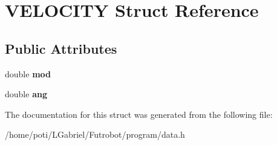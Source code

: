 \hypertarget{structVELOCITY}{}\section{V\+E\+L\+O\+C\+I\+TY Struct Reference}
\label{structVELOCITY}
\subsection*{Public Attributes}
\begin{DoxyCompactItemize}
\item 
double {\bfseries mod}\hypertarget{structVELOCITY_a93279f041bc0819612560a52082b3d51}{}\label{structVELOCITY_a93279f041bc0819612560a52082b3d51}

\item 
double {\bfseries ang}\hypertarget{structVELOCITY_abac02532546a545b611747a744097303}{}\label{structVELOCITY_abac02532546a545b611747a744097303}

\end{DoxyCompactItemize}


The documentation for this struct was generated from the following file\+:\begin{DoxyCompactItemize}
\item 
/home/poti/\+L\+Gabriel/\+Futrobot/program/data.\+h\end{DoxyCompactItemize}
